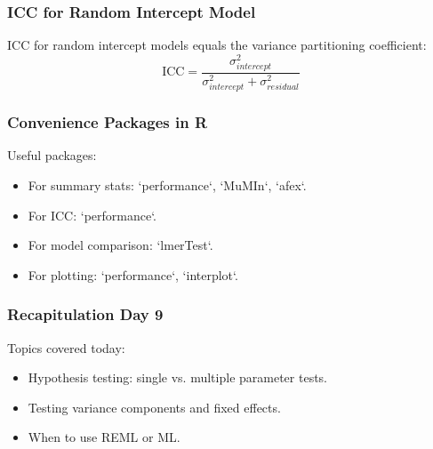 \documentclass{beamer}
\begin{document}
\begin{frame}
    \frametitle{ICC for Random Intercept Model}
    ICC for random intercept models equals the variance partitioning coefficient:
    \[
    \text{ICC} = \frac{\sigma^2_{intercept}}{\sigma^2_{intercept} + \sigma^2_{residual}}
    \]
\end{frame}

\begin{frame}
    \frametitle{Convenience Packages in R}
    Useful packages:
    \begin{itemize}
        \item For summary stats: `performance`, `MuMIn`, `afex`.
        \item For ICC: `performance`.
        \item For model comparison: `lmerTest`.
        \item For plotting: `performance`, `interplot`.
    \end{itemize}
\end{frame}

\begin{frame}
    \frametitle{Recapitulation Day 9}
    Topics covered today:
    \begin{itemize}
        \item Hypothesis testing: single vs. multiple parameter tests.
        \item Testing variance components and fixed effects.
        \item When to use REML or ML.
    \end{itemize}
\end{frame}
\end{document}
